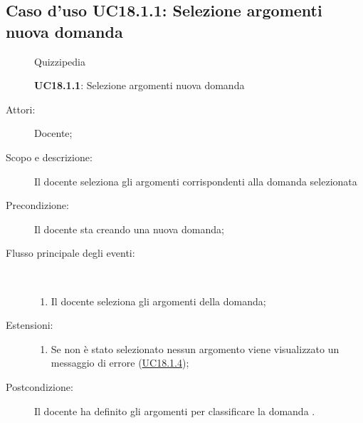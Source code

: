 \subsection{Caso d'uso UC18.1.1: Selezione argomenti nuova domanda}
	\begin{figure}[H]
		\centering
		\begin{resizedtikzpicture}{\textwidth}
		\begin{umlsystem}[x=0, fill=lightgray!20]{Quizzipedia}
		\end{umlsystem}
		\end{resizedtikzpicture}
		\caption{\textbf{UC18.1.1}: Selezione argomenti nuova domanda}
		\label{UC18.1.1}
	\end{figure}
\begin{description}
\item[Attori:] Docente;
\item[Scopo e descrizione:] Il docente seleziona gli argomenti corrispondenti alla domanda selezionata
      \item[Precondizione:] Il docente sta creando una nuova domanda;

        \item[Flusso principale degli eventi:] \ 
 \begin{enumerate}
          \item Il docente seleziona gli argomenti della domanda;

      \end{enumerate}
    \item[Estensioni:]
      \begin{enumerate}
          \item Se non è stato selezionato nessun argomento viene visualizzato un messaggio di errore (\hyperlink{UC18.1.4}{UC18.1.4});

      \end{enumerate}
    \item[Postcondizione:] Il docente ha definito gli argomenti per classificare la domanda
.
  \end{description}
\hypertarget{UC18.1.2}{}
